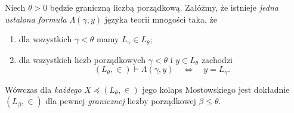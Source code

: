 \begin{twierdzenie}
\label{thm:l-condensation-from-uniform-recognition-75}
Niech $\theta>0$ będzie graniczną liczbą porządkową.
Załóżmy, że istnieje \emph{jedna ustalona formuła}
$\Lambda(\gamma,y)$ języka teorii mnogości taka, że
\begin{enumerate}[label=(\roman*)]
\item dla wszystkich $\gamma<\theta$ mamy
$L_\gamma\in L_\theta$;
\item dla wszystkich liczb porządkowych
$\gamma<\theta$ i $y\in L_\theta$ zachodzi
\[
(L_\theta,\in)\models\Lambda(\gamma,y)
\quad\Longleftrightarrow\quad y=L_\gamma.
\]
\end{enumerate}
Wówczas dla \emph{każdego}
$X\preccurlyeq(L_\theta,\in)$ jego kolaps Mostowskiego
jest dokładnie $(L_\beta,\in)$ dla pewnej
\emph{granicznej} liczby porządkowej $\beta\le\theta$.
\end{twierdzenie}
